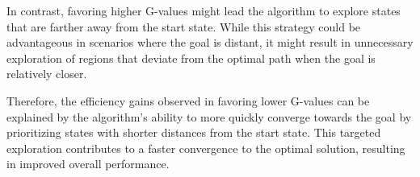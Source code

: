 In contrast, favoring higher G-values might lead the algorithm to explore states that are farther away from the start state. While this strategy could be advantageous in scenarios where the goal is distant, it might result in unnecessary exploration of regions that deviate from the optimal path when the goal is relatively closer.

Therefore, the efficiency gains observed in favoring lower G-values can be explained by the algorithm's ability to more quickly converge towards the goal by prioritizing states with shorter distances from the start state. This targeted exploration contributes to a faster convergence to the optimal solution, resulting in improved overall performance. 